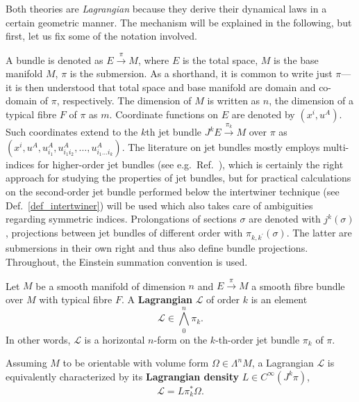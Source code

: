 Both theories are \emph{Lagrangian} because they derive their dynamical laws in a certain geometric manner. The mechanism will be explained in the following, but first, let us fix some of the notation involved.

A bundle is denoted as $E\overset{\pi}{\longrightarrow}M$, where $E$ is the total space, $M$ is the base manifold $M$, $\pi$ is the submersion. As a shorthand, it is common to write just $\pi$---it is then understood that total space and base manifold are domain and co-domain of $\pi$, respectively. The dimension of $M$ is written as $n$, the dimension of a typical fibre $F$ of $\pi$ as $m$. Coordinate functions on $E$ are denoted by $(x^i,u^A)$. Such coordinates extend to the $k$th jet bundle $J^kE \overset{\pi_k}{\longrightarrow}M$ over $\pi$ as $(x^i,\allowbreak u^A,\allowbreak u^A_{i_1},\allowbreak u^A_{i_1i_2},\allowbreak \dots,\allowbreak u^A_{i_1\dots i_k})$. The literature on jet bundles mostly employs multi-indices for higher-order jet bundles (see e.g.~Ref.~\cite{Saunders_1989}), which is certainly the right approach for studying the properties of jet bundles, but for practical calculations on the second-order jet bundle performed below the intertwiner technique (see Def.~\ref{def_intertwiner}) will be used which also takes care of ambiguities regarding symmetric indices. Prolongations of sections $\sigma$ are denoted with $j^k(\sigma)$, projections between jet bundles of different order with $\pi_{k,k^\prime}(\sigma)$. The latter are submersions in their own right and thus also define bundle projections. Throughout, the Einstein summation convention is used.

\begin{definition}[Lagrangian]
  Let $M$ be a smooth manifold of dimension $n$ and $E \overset{\pi}{\longrightarrow} M$ a smooth fibre bundle over $M$ with typical fibre $F$. A \textbf{Lagrangian} $\mathscr L$ of order $k$ is an element
  \begin{equation}
    \mathscr L \in \textstyle\bigwedge^n_0\pi_k.
  \end{equation}
In other words, $\mathscr L$ is a horizontal $n$-form on the $k$-th-order jet bundle $\pi_k$ of $\pi$.

Assuming $M$ to be orientable with volume form $\Omega\in\Lambda^nM$, a Lagrangian $\mathscr L$ is equivalently characterized by its \textbf{Lagrangian density} $L\in C^\infty(J^k\pi)$,
  \begin{equation}\label{lagrangian_density}
  \mathscr L = L\pi_k^\ast\Omega.
\end{equation}
\end{definition}

